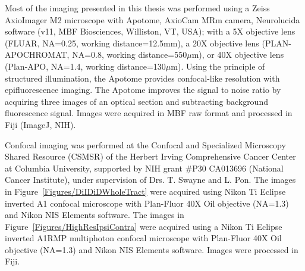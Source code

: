 Most of the imaging presented in this thesis was performed using a Zeiss AxioImager M2 microscope with Apotome, AxioCam MRm camera, Neurolucida software (v11, MBF Biosciences, Williston, VT, USA); with a 5X objective lens (FLUAR, NA=0.25, working distance=12.5mm), a 20X objective lens (PLAN-APOCHROMAT, NA=0.8, working distance=550$\mu$m), or 40X objective lens (Plan-APO, NA=1.4, working distance=130$\mu$m).
Using the principle of structured illumination, the Apotome provides confocal-like resolution with epifluorescence imaging.
The Apotome improves the signal to noise ratio by acquiring three images of an optical section and subtracting background fluorescence signal.
Images were acquired in MBF raw format and processed in Fiji (ImageJ, NIH).

Confocal imaging was performed at the Confocal and Specialized Microscopy Shared Resource (CSMSR) of the Herbert Irving Comprehensive Cancer Center at Columbia University, supported by NIH grant \#P30 CA013696 (National Cancer Institute), under supervision of Drs. T. Swayne and L. Pon.
The images in Figure~\ref{Figures/DiIDiDWholeTract} were acquired using Nikon Ti Eclipse inverted A1 confocal microscope with Plan-Fluor 40X Oil objective (NA=1.3) and Nikon NIS Elements software.
The images in Figure~\ref{Figures/HighResIpsiContra} were acquired using a Nikon Ti Eclipse inverted A1RMP multiphoton confocal microscope with Plan-Fluor 40X Oil objective (NA=1.3) and Nikon NIS Elements software.
Images were processed in Fiji.
